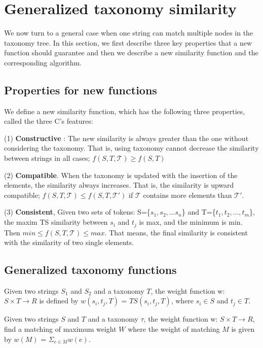 
\section{Generalized taxonomy similarity}

We now turn to a general case when one string can match multiple nodes in the taxonomy tree. In this section,  we first describe three key properties that a new function should guarantee and then we describe a new similarity function and the corresponding algorithm.



\subsection{Properties for new functions}

We define a new similarity function, which has the following three properties, called the three C's features:

(1) \textbf{Constructive }:  The new similarity is always greater than the one without considering the taxonomy. That is, using taxonomy  cannot decrease the similarity between strings in all cases; $f(S,T,\mathcal{T} ) \geq  f(S,T) $

(2) \textbf{Compatible}. When the taxonomy is updated with the insertion of the elements, the similarity always increases. That is, the similarity is upward compatible; $f(S,T,\mathcal{T} ) \leq  f(S,T, \mathcal{T'}) $ if $\mathcal{T}$ contains more elements than $\mathcal{T'}$.

(3) \textbf{Consistent}, Given two sets of tokens: S=\{$s_1,s_2,...s_n$\} and T=\{$t_1,t_2,...,t_m$\}, the maxim TS similarity between $s_i$ and $t_j$ is max, and the minimum is min. Then $ min \leq f(S,T,\mathcal{T} ) \leq max $. That means, the final similarity is consistent with the similarity of two single elements.

\subsection{Generalized taxonomy functions}


\begin{definition}  Given two strings $S_1$ and $S_2$ and a taxonomy $T$, the weight function w: $S \times T \rightarrow R$ is defined by $w(s_i, t_j,T)$ = $TS(s_i,t_j,T)$, where $s_i \in S$ and $t_j \in T$.
\end{definition}

\begin{definition}  Given two strings $S$ and $T$ and a taxonomy $\tau$, the weight function w: $S \times T \rightarrow R$, find a matching of maximum weight $W$ where the weight of matching $M$ is given by $w(M)$ = $\Sigma_{e \in M} w(e)$.
\end{definition}

